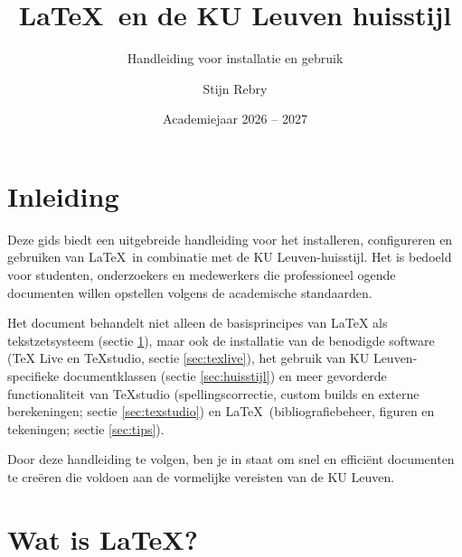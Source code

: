 \documentclass[kulak]{kulakarticle} %
\title{\LaTeX\ en de KU Leuven huisstijl}
\subtitle{Handleiding voor installatie en gebruik}
\author{Stijn Rebry}
\date{Academiejaar 2026 -- 2027}
\begin{document}
\maketitle

\tableofcontents

\section*{Inleiding}

Deze gids biedt een uitgebreide handleiding voor het installeren, configureren en gebruiken van \LaTeX\ in combinatie met de KU Leuven-huisstijl. Het is bedoeld voor studenten, onderzoekers en medewerkers die professioneel ogende documenten willen opstellen volgens de academische standaarden.

Het document behandelt niet alleen de basisprincipes van LaTeX als tekstzetsysteem (sectie \ref{sec:latex}), maar ook de installatie van de benodigde software (TeX Live en TeXstudio, sectie \ref{sec:texlive}), het gebruik van KU Leuven-specifieke documentklassen (sectie \ref{sec:huisstijl}) en meer gevorderde functionaliteit van TeXstudio (spellingscorrectie, custom builds en externe berekeningen; sectie \ref{sec:texstudio}) en \LaTeX\ (bibliografiebeheer, figuren en tekeningen; sectie \ref{sec:tips}).

Door deze handleiding te volgen, ben je in staat om snel en efficiënt documenten te creëren die voldoen aan de vormelijke vereisten van de KU Leuven.

\section{Wat is \LaTeX?}
\label{sec:latex}
\end{document}
